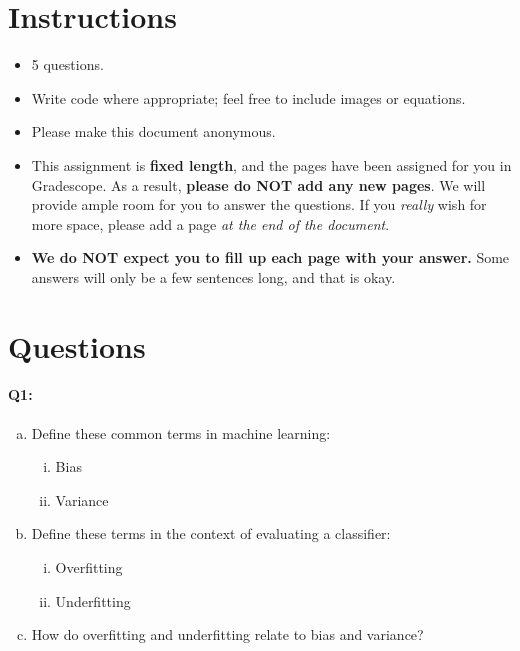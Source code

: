 \section*{Instructions}
\begin{itemize}
  \item 5 questions.
  \item Write code where appropriate; feel free to include images or equations.
  \item Please make this document anonymous.
  \item This assignment is \textbf{fixed length}, and the pages have been assigned for you in Gradescope. As a result, \textbf{please do NOT add any new pages}. We will provide ample room for you to answer the questions. If you \emph{really} wish for more space, please add a page \emph{at the end of the document}.
  \item \textbf{We do NOT expect you to fill up each page with your answer.} Some answers will only be a few sentences long, and that is okay.
\end{itemize}

\section*{Questions}


\paragraph{Q1:} 

\begin{enumerate} [(a)]
    \item Define these common terms in machine learning:
    \begin{enumerate} [(i)]
    \item Bias
    \item Variance
    \end{enumerate}
    \item Define these terms in the context of evaluating a classifier:
    \begin{enumerate} [(i)]
    \item Overfitting
    \item Underfitting
    \end{enumerate}
    \item How do overfitting and underfitting relate to bias and variance?
\end{enumerate}

